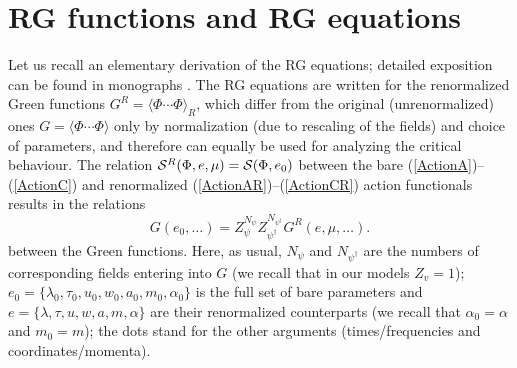 \documentclass[12pt]{iopart}
\def\S{{\cal S}}
\begin{document}
\section{RG functions and RG equations} \label{sec:RGE}

Let us recall an elementary derivation of the RG equations; detailed
exposition can be found in monographs \cite{Zinn,Book3}.
The RG equations are written for the renormalized Green functions
$G^{R} =\langle \Phi\cdots\Phi\rangle_{R}$, which differ from the original
(unrenormalized) ones $G =\langle \Phi\cdots\Phi\rangle$ only by
normalization (due to rescaling of the fields) and choice of parameters,
and therefore can equally be used for analyzing the critical behaviour.
The relation $\S^{R} (\Phi,e,\mu) = \S(\Phi,e_{0})$ between the bare
(\ref{ActionA})--(\ref{ActionC}) and renormalized
(\ref{ActionAR})--(\ref{ActionCR}) action functionals results
in the relations
\begin{equation}
G(e_{0},\dots) = Z_{\psi}^{N_{\psi}} Z_{\psi^{\dagger}}^{N_{\psi^{\dagger}}}
G^{R}(e,\mu,\dots).
\label{multi}
\end{equation}
between the Green functions. Here, as usual, $N_{\psi}$ and
$N_{\psi^{\dagger}}$ are the numbers of corresponding fields
entering into $G$ (we recall that in our models $Z_{v}=1$);
$e_{0}=\{\lambda_{0}, \tau_{0}, u_{0}, w_{0}, a_{0}, m_{0}, \alpha_{0} \}$
is the full set of bare parameters and
$e=\{ \lambda, \tau, u, w, a, m, \alpha  \}$ are their renormalized
counterparts (we recall that $\alpha_{0}=\alpha$ and $m_{0}=m$);
the dots stand for the other arguments
(times/frequencies and coordinates/momenta).
\end{document}
